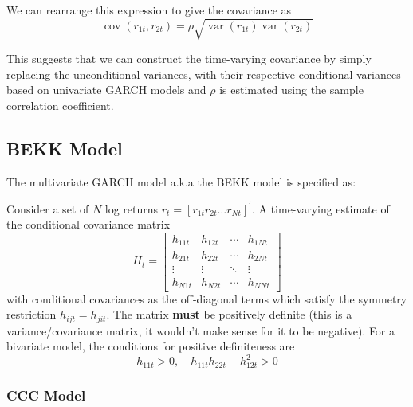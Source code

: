 \documentclass[11pt]{article}
\begin{document}
We can rearrange this expression to give the covariance as
\[\operatorname{cov}\left(r_{1 t}, r_{2 t}\right) = \rho \sqrt{\operatorname{var}\left(r_{1 t}\right) \operatorname{var}\left(r_{2 t}\right)}\]

This suggests that we can construct the time-varying covariance by simply replacing the unconditional variances, with their respective conditional variances based on univariate GARCH models and $\rho$ is estimated using the sample correlation coefficient.



\subsection{BEKK Model}
\begin{definition}

The multivariate GARCH model a.k.a the BEKK model is specified as:

Consider a set of $N$ log returns $r_t = [r_{1t} r_{2t} \ldots r_{Nt}]^\prime$. A time-varying estimate of the conditional covariance matrix 
\begin{equation}
H_t=\left[\begin{array}{cccc}
h_{11 t} & h_{12 t} & \cdots & h_{1 N t} \\
h_{21 t} & h_{22 t} & \cdots & h_{2 N t} \\
\vdots & \vdots & \ddots & \vdots \\
h_{N 1 t} & h_{N 2 t} & \cdots & h_{N N t}
\end{array}\right]
\end{equation}
with conditional covariances as the off-diagonal terms which satisfy the symmetry restriction $h_{ijt} = h_{jit}$. The matrix \textbf{must} be positively definite (this is a variance/covariance matrix, it wouldn't make sense for it to be negative). For a bivariate model, the conditions for positive definiteness are
\begin{equation}
    \label{conditions for positive definiteness}
    h_{11t}>0, \quad h_{11t} h_{22t} - h_{12t}^2>0
\end{equation}
\end{definition}

\subsubsection{CCC Model}
\end{document}
